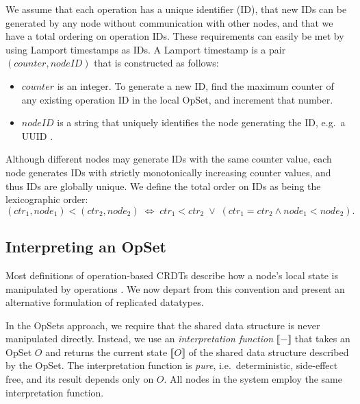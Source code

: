 We assume that each operation has a unique identifier (ID), that new IDs can be generated by any node without communication with other nodes, and that we have a total ordering on operation IDs.
These requirements can easily be met by using Lamport timestamps \cite{Lamport:1978jq} as IDs.
A Lamport timestamp is a pair $(\mathit{counter}, \mathit{nodeID})$ that is constructed as follows:
\begin{itemize}
\item $\mathit{counter}$ is an integer.
    To generate a new ID, find the maximum counter of any existing operation ID in the local OpSet, and increment that number.
\item $\mathit{nodeID}$ is a string that uniquely identifies the node generating the ID, e.g.\ a UUID \cite{Leach:2005hm}.
\end{itemize}

Although different nodes may generate IDs with the same counter value, each node generates IDs with strictly monotonically increasing counter values, and thus IDs are globally unique.
We define the total order on IDs as being the lexicographic order:
\[
    (\mathit{ctr}_1, \mathit{node}_1) < (\mathit{ctr}_2, \mathit{node}_2)
    \;\Longleftrightarrow\;
    \mathit{ctr}_1 < \mathit{ctr}_2 \;\vee\;
    (\mathit{ctr}_1 = \mathit{ctr}_2 \wedge \mathit{node}_1 <\mathit{node}_2).
\]


\subsection{Interpreting an OpSet}\label{sec:op-serial}

Most definitions of operation-based CRDTs describe how a node's local state is manipulated by operations \cite{Shapiro:2011wy,Shapiro:2011un}.
We now depart from this convention and present an alternative formulation of replicated datatypes.

In the OpSets approach, we require that the shared data structure is never manipulated directly.
Instead, we use an \emph{interpretation function} $\llbracket-\rrbracket$ that takes an OpSet $O$ and returns the current state $\llbracket O \rrbracket$ of the shared data structure described by the OpSet.
The interpretation function is \emph{pure}, i.e.\ deterministic, side-effect free, and its result depends only on $O$.
All nodes in the system employ the same interpretation function.

